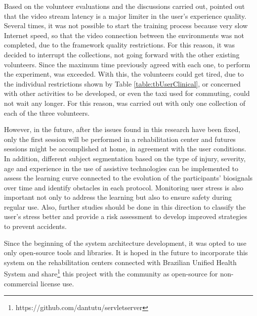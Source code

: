 Based on the volunteer evaluations and the discussions carried out, pointed out that the video stream latency is a major limiter in the user's experience quality. Several times, it was not possible to start the training process because very slow Internet speed, so that the video connection between the environments was not completed, due to the framework quality restrictions. For this reason, it was decided to interrupt the collections, not going forward with the other existing volunteers. Since the maximum time previously agreed with each one, to perform the experiment, was exceeded. With this, the volunteers could get tired, due to the individual restrictions shown by Table \ref{table:tbUserClinical}, or concerned with other activities to be developed, or even the taxi used for commuting, could not wait any longer. For this reason, was carried out with only one collection of each of the three volunteers.


However, in the future, after the issues found in this research have been fixed, only the first session will be performed in a rehabilitation center and futures sessions might be accomplished at home, in agreement with the user conditions. In addition, different subject segmentation based on the type of injury, severity, age and experience in the use of assistive technologies can be implemented to assess the learning curve connected to the evolution of the participants' biosignals over time and identify obstacles in each protocol. Monitoring user stress is also important not only to address the learning but also to ensure safety during regular use. Also, further studies should be done in this direction to classify the user's stress better and provide a risk assessment to develop improved strategies to prevent accidents.

Since the beginning of the system architecture development, it was opted to use only open-source tools and libraries. It is hoped in the future to incorporate this system on the rehabilitation centers connected with Brazilian Unified Health System and share\footnote{https://github.com/dantutu/servletserver} this project with the community as open-source for non-commercial license use.

 